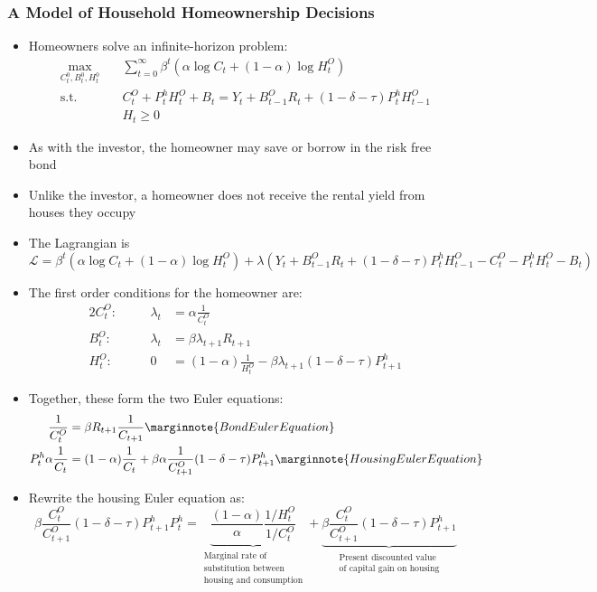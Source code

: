 \documentclass{article}
\numberwithin{equation}{section}
\numberwithin{figure}{section}
\begin{document}
\subsubsection{A Model of Household Homeownership Decisions}
	\begin{itemize}
		\item Homeowners solve an infinite-horizon problem:
		\begin{align*}
			\max_{C_t^0,B_t^0,H_t^0}\quad &\sum_{t=0}^{\infty} \beta^t (\alpha\log C_t+(1-\alpha)\log H_t^O) \\
			\text{s.t.}\quad &C_t^O + P_t^h H_t^O + B_t = Y_t + B_{t-1}^O R_t + (1-\delta-\tau)P_t^h H_{t-1}^O\\
			& H_t \geq 0
		\end{align*}
		\item As with the investor, the homeowner may \textcolor{myblue}{save} or \textcolor{myblue}{borrow} in the risk free bond
		\item Unlike the investor, a homeowner does not receive the rental yield from houses they occupy
		\item The Lagrangian is
		\[
			\mathcal{L} = \beta^t (\alpha\log C_t+(1-\alpha)\log H_t^O) + \lambda(Y_t + B_{t-1}^O R_t + (1-\delta-\tau)P_t^h H_{t-1}^O - C_t^O - P_t^h H_t^O - B_t)
		\]
		\item The first order conditions for the homeowner are:
		\begin{alignat*}{2}
			C_t^O:\quad && \lambda_t&= \alpha\frac{1}{C_t^O}\\
			B_t^O:\quad && \lambda_t&= \beta\lambda_{t+1}R_{t+1}\\
			H_t^O:\quad && 0&= (1-\alpha)\frac{1}{H_t^O}-\beta\lambda_{t+1}(1-\delta-\tau)P_{t+1}^h
		\end{alignat*}
		\item Together, these form the two Euler equations:
		\begin{align*}{2}
			\frac{1}{C_t^O} &= \beta R_{t+1} \frac{1}{C_{t+1}} \marginnote{Bond Euler Equation}\\
			P_t^h \alpha\frac{1}{C_t} &= (1-\alpha)\frac{1}{C_t} + \beta\alpha\frac{1}{C_{t+1}^O} (1-\delta-\tau)P_{t+1}^h \marginnote{Housing Euler Equation}
		\end{align*}
		\item Rewrite the housing Euler equation as:
		\[\beta\frac{C_t^O}{C_{t+1}^O}(1-\delta-\tau)P_{t+1}^h
			P_t^h = \underbrace{\frac{(1-\alpha)}{\alpha}\frac{1/H_t^O}{1/C_t^O}}_{\substack{\text{Marginal rate of}\\\text{substitution between}\\\text{housing and consumption}}} + \underbrace{\beta\frac{C_t^O}{C_{t+1}^O} (1-\delta-\tau)P_{t+1}^h}_{\substack{\text{Present discounted value}\\\text{of capital gain on housing}}}
\]
\end{itemize}
\end{document}
